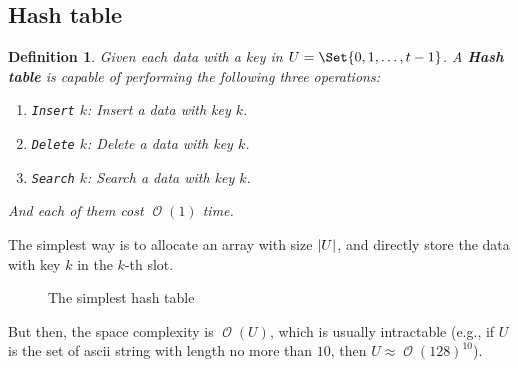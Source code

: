 \documentclass[12pt, a4paper]{article}
\DeclarePairedDelimiter{\abs}{\lvert}{\rvert}
\newcommand{\ord}{\operatorname{\mathcal{O}}}
\theoremstyle{mystyle} %
\newtheorem{definition}{Definition}
\begin{document}
\setcounter{section}{5}

\subsection{Hash table}

\begin{definition}
  Given each data with a key in $U = \Set{0, 1, \dots, t-1 }$.
  A {\bf Hash table} is capable of performing the following three operations:
  \begin{enumerate}
    \item \texttt{Insert} $k$: Insert a data with key $k$.
    \item \texttt{Delete} $k$: Delete a data with key $k$.
    \item \texttt{Search} $k$: Search a data with key $k$.
  \end{enumerate}
  And each of them cost $\ord(1)$ time.
\end{definition}

The simplest way is to allocate an array with size $\abs{U}$, and directly
store the data with key $k$ in the $k$-th slot.

\begin{figure}[H]
  \centering
  \caption{The simplest hash table}
\end{figure}

But then, the space complexity is $\ord(U)$, which is usually intractable
(e.g., if $U$ is the set of ascii string with length no more than $10$, then
$U \approx \ord(128)^{10}$).
\end{document}

